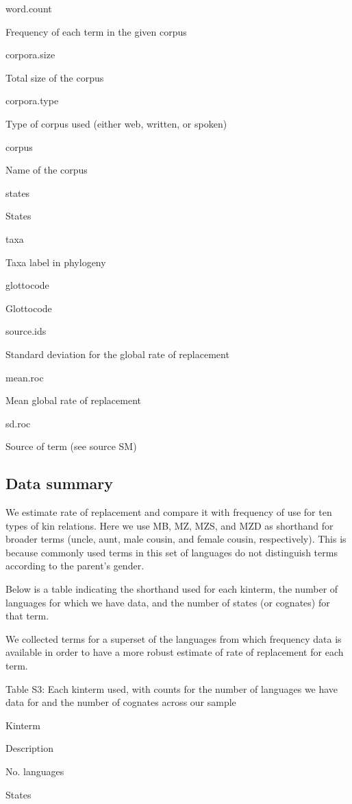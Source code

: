 \documentclass[]{article}
\begin{document}
word.count

Frequency of each term in the given corpus

corpora.size

Total size of the corpus

corpora.type

Type of corpus used (either web, written, or spoken)

corpus

Name of the corpus

states

States

taxa

Taxa label in phylogeny

glottocode

Glottocode

source.ids

Standard deviation for the global rate of replacement

mean.roc

Mean global rate of replacement

sd.roc

Source of term (see source SM)

\subsection{Data summary}\label{data-summary}

We estimate rate of replacement and compare it with frequency of use for
ten types of kin relations. Here we use MB, MZ, MZS, and MZD as
shorthand for broader terms (uncle, aunt, male cousin, and female
cousin, respectively). This is because commonly used terms in this set
of languages do not distinguish terms according to the parent's gender.

Below is a table indicating the shorthand used for each kinterm, the
number of languages for which we have data, and the number of states (or
cognates) for that term.

We collected terms for a superset of the languages from which frequency
data is available in order to have a more robust estimate of rate of
replacement for each term.

Table S3: Each kinterm used, with counts for the number of languages we
have data for and the number of cognates across our sample

Kinterm

Description

No. languages

States
\end{document}
